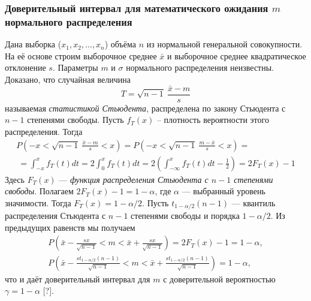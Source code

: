 \subsubsection{Доверительный интервал для математического ожидания $m$ нормального распределения}
Дана выборка ($x_{1}, x_{2}, \dots, x_{n}$) объёма $n$ из нормальной генеральной совокупности. На её основе строим выборочное среднее $\bar{x}$ и выборочное среднее квадратическое отклонение $s$. Параметры $m$ и $\sigma$ нормального распределения неизвестны.
\newline
Доказано, что случайная величина
\begin{equation}
	T = \sqrt{n - 1} \ \frac{\bar{x} - m}{s}
	\label{eq:T}
\end{equation}
называемая \textit{статистикой Стьюдента}, распределена по закону Стьюдента с $n-1$ степенями свободы. Пусть $f_{T}(x)$ -- плотность вероятности этого распределения. Тогда 
\begin{multline}
	P\left(-x < \sqrt{n - 1} \ \frac{\bar{x} - m}{s} < x \right) = 
	P\left(-x < \sqrt{n - 1} \ \frac{m - \bar{x}}{s} < x \right) = \\\
	= \int_{-x}^{x}{f_{T}(t)d t} = 2 \int_{0}^{x}{f_{T}(t)d t} = 
	2\left(  \int_{-\infty}^{x}{f_{T}(t)d t} - \frac{1}{2} \right) = 2F_{T}(x) - 1
	\label{eq:P_f_t}
\end{multline}
Здесь $F_{T}(x)$ — \textit{функция распределения Стьюдента с $n-1$ степенями свободы}.
\newline
Полагаем $2F_{T}(x)-1 = 1-\alpha$, где $\alpha$ — выбранный уровень значимости. Тогда $F_{T}(x) = 1-\alpha/2$. Пусть $t_{1-\alpha/2} (n-1)$ — квантиль распределения Стьюдента с $n-1$ степенями свободы и порядка $1-\alpha/2$. Из предыдущих равенств мы получаем 
\begin{equation}
	\begin{split}
		P\left(\bar{x} - \frac{sx}{\sqrt{n-1}} < m <  \bar{x} + \frac{sx}{\sqrt{n-1}}\right) = 2F_{T}(x) - 1 = 1 - \alpha,  \\
		P\left(\bar{x} - \frac{s t_{1-\alpha/2} (n-1)}{\sqrt{n-1}} < m <  \bar{x} + \frac{s t_{1-\alpha/2} (n-1)}{\sqrt{n-1}}\right)= 1 - \alpha, 
		\label{eq:P_m}     
	\end{split}
\end{equation}
что и даёт доверительный интервал для $m$ с доверительной вероятностью $\gamma = 1-\alpha$ [?].

